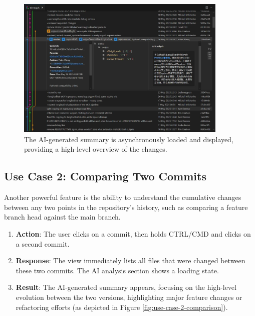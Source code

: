 \begin{figure}[h!]
    \centering
    \includegraphics[width=0.9\textwidth]{figures/use-case-1-loaded.jpg}
    \caption{The AI-generated summary is asynchronously loaded and displayed, providing a high-level overview of the changes.}
    \label{fig:use-case-1-loaded}
\end{figure}


\subsection{Use Case 2: Comparing Two Commits}
Another powerful feature is the ability to understand the cumulative changes between any two points in the repository's history, such as comparing a feature branch head against the main branch.

\begin{enumerate}
    \item \textbf{Action}: The user clicks on a commit, then holds CTRL/CMD and clicks on a second commit.
    \item \textbf{Response}: The view immediately lists all files that were changed between these two commits. The AI analysis section shows a loading state.
    \item \textbf{Result}: The AI-generated summary appears, focusing on the high-level evolution between the two versions, highlighting major feature changes or refactoring efforts (as depicted in Figure \ref{fig:use-case-2-comparison}).
\end{enumerate}

